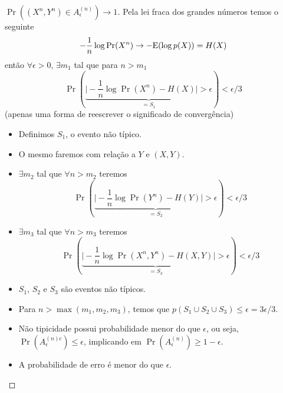 \begin{frame}[allowframebreaks]
  \framebreak

  \begin{proof}[$\Pr \left( (X^n,Y^n) \in A_{\epsilon}^{(n)} \right) \rightarrow 1$]
  Pela lei fraca dos grandes números temos o seguinte
	\begin{equation}
	- \frac{1}{n} \log \Pr (X^n) \rightarrow - \mathrm{E} (\log p(X)) = H(X)
	\end{equation}
  então $\forall \epsilon > 0$, $\exists m_1$ tal que para $n > m_1$
	\begin{equation}
	\Pr \left( \underbrace{\vert - \frac{1}{n} \log \Pr (X^n) - H(X) \vert > \epsilon }_{=S_1}   \right) < \epsilon/3
	\end{equation}
  (apenas uma forma de reescrever o significado de convergência)
  \begin{itemize}
  \item Definimos $S_1$, o evento não típico.
  \end{itemize}

  \proofbreak

  \begin{itemize}
  \item O mesmo faremos com relação a $Y$ e $(X,Y)$.
  \item $\exists m_2$ tal que $\forall n > m_2$ teremos
        \begin{equation}
        \Pr \left( \underbrace{\vert - \frac{1}{n} \log \Pr (Y^n) - H(Y) \vert > \epsilon }_{=S_2}   \right) < \epsilon/3
        \end{equation}
  \end{itemize}

  \proofbreak

  \begin{itemize}
  \item $\exists m_3$ tal que $\forall n > m_3$ teremos
        \begin{equation}
        \Pr \left( \underbrace{\vert - \frac{1}{n} \log \Pr (X^n,Y^n) - H(X,Y) \vert > \epsilon }_{=S_3}   \right) < \epsilon/3
        \end{equation}
  \item $S_1$, $S_2$ e $S_3$ são eventos não típicos.
  \end{itemize}

  \proofbreak

  \begin{itemize}
  \item Para $n > \max(m_1, m_2, m_3)$, temos que $p(S_1 \cup S_2 \cup S_3) \leq \epsilon = 3\epsilon/3$.
  \item Não tipicidade possui probabilidade menor do que $\epsilon$, ou seja, $\Pr( A_{\epsilon}^{(n)c} ) \leq \epsilon$, 
	implicando em $\Pr( A_{\epsilon}^{(n)} ) \geq 1 - \epsilon$.
  \item A probabilidade de erro é menor do que $\epsilon$.
  \end{itemize}


\end{proof}
\end{frame}
